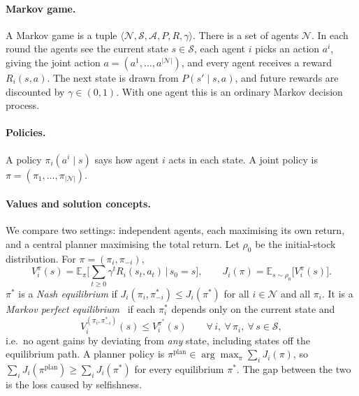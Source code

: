 \documentclass{article}
\begin{document}
\paragraph{Markov game.} A Markov game is a tuple $\langle \mathcal N, \mathcal S, \mathcal A, P, R, \gamma\rangle$. There is a set of agents $\mathcal N$. In each round the agents see the current state $s\in\mathcal S$, each agent $i$ picks an action $a^i$, giving the joint action $a=(a^1,\dots,a^{|\mathcal N|})$, and every agent receives a reward $R_i(s,a)$. The next state is drawn from $P(s'\mid s,a)$, and future rewards are discounted by $\gamma\in(0,1)$. With one agent this is an ordinary Markov decision process.

\paragraph{Policies.} A policy $\pi_i(a^i\mid s)$ says how agent $i$ acts in each state. A joint policy is $\pi=(\pi_1,\dots,\pi_{|\mathcal N|})$.

\paragraph{Values and solution concepts.} We compare two settings: independent agents, each maximising its own return, and a central planner maximising the total return. Let $\rho_0$ be the initial-stock distribution. For $\pi=(\pi_i,\pi_{-i})$,
\begin{equation}
V_i^{\pi}(s)=\mathbb{E}_{\pi}\Big[\sum_{t\ge0}\gamma^{t}R_i(s_t,a_t)\,\Big|\,s_0=s\Big],\qquad
J_i(\pi)=\mathbb{E}_{s\sim\rho_0}\big[V_i^{\pi}(s)\big].
\end{equation}
$\pi^{*}$ is a \emph{Nash equilibrium} if $J_i(\pi_i,\pi^{*}_{-i})\le J_i(\pi^{*})$ for all $i\in\mathcal N$ and all $\pi_i$.
It is a \emph{Markov perfect equilibrium}~\cite{maskin2001} if each $\pi^{*}_i$ depends only on the current state and
\begin{equation}
V_i^{(\pi_i,\pi^{*}_{-i})}(s)\le V_i^{\pi^{*}}(s)\qquad\forall\, i,\ \forall\,\pi_i,\ \forall\, s\in\mathcal S,
\end{equation}
i.e.\ no agent gains by deviating from \emph{any} state, including states off the equilibrium path.
A planner policy is $\pi^{\mathrm{plan}}\in\arg\max_{\pi}\sum_{i}J_i(\pi)$, so $\sum_i J_i(\pi^{\mathrm{plan}})\ge\sum_i J_i(\pi^{*})$ for every
equilibrium $\pi^{*}$. The gap between the two is the loss caused by selfishness.
\end{document}
